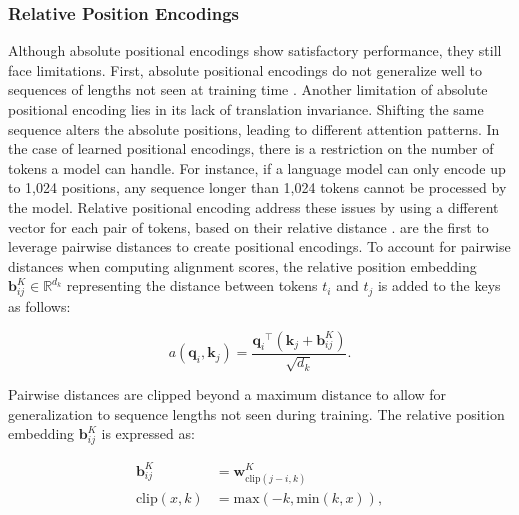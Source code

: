 \subsubsection{Relative Position Encodings}

Although absolute positional encodings show satisfactory performance, they still face limitations. First, absolute positional encodings do not generalize well to sequences of lengths not seen at training time \citep{dai2019transformer}. Another limitation of absolute positional encoding lies in its lack of translation invariance. Shifting the same sequence alters the absolute positions, leading to different attention patterns. In the case of learned positional encodings,  there is a restriction on the number of tokens a model can handle. For instance, if a language model can only encode up to 1,024 positions, any sequence longer than 1,024 tokens cannot be processed by the model. Relative positional encoding address these issues by using a different vector for each pair of tokens, based on their relative distance \citep{shaw2018self, huang2018music, ke2020rethinking}. \citet{shaw2018self} are the first to leverage pairwise distances to create positional encodings. To account for pairwise distances when computing alignment scores, the relative position embedding $\bm{b}^K_{ij} \in \mathbb{R}^{d_k}$ representing the distance between tokens $t_i$ and $t_j$ is added to the keys as follows:


\begin{equation}
    a(\bm{q}_i, \bm{k}_j) = \frac{{\bm{q}_i}^{\top} (\bm{k}_j + \bm{b}^K_{ij})}{\sqrt{d_k}}.
\end{equation}

\noindent Pairwise distances are clipped beyond a maximum distance to allow for generalization to sequence lengths not seen during training. The relative position embedding $\bm{b}^K_{ij}$ is expressed as:

\begin{equation}
\begin{aligned}
    \bm{b}^K_{ij} &= \bm{w}^K_{\text{clip}(j-i, k)} \\
    \text{clip}(x, k) &= \text{max}(-k, \text{min}(k, x)),
\end{aligned}
\end{equation}

